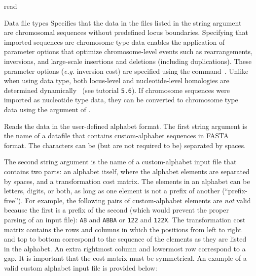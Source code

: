 \begin{command}{read}{}
\begin{arguments}
\begin{argumentgroup}{Data file types}
            {Specifies that the data in the files listed in the string argument
            are chromosomal sequences without predefined locus boundaries.
            Specifying that imported sequences are chromosome type data enables
            the application of parameter options that optimize chromosome-level
            events such as rearrangements, inversions, and large-scale
            insertions and deletions (including duplications). These parameter
            options (\emph{e.g.} inversion cost) are specified using the
            command~.  
            Unlike when using  data type,
            both locus-level and nucleotide-level homologies
            are determined dynamically~\cite{darlingetal2004, vinh2007} 
            (see tutorial \texttt{5.6}). If chromosome sequences were imported as
            nucleotide type data, they can be converted to chromosome type data
            using the argument  of
            .} 
            {}
            
            {Reads the data in the user-defined alphabet format. The first string argument is
            the name of a datafile that contains custom-alphabet sequences in FASTA format. 
            The characters can be (but are not required to be) separated by spaces.
            
            The second string argument is the name of a custom-alphabet input file that contains two parts:
            an alphabet itself, where the alphabet elements are separated by spaces, and a
            transformation cost matrix. The elements in an alphabet can be letters, digits, or
            both, as long as one element is not a prefix of another  (``prefix-free''). For
            example, the following pairs of custom-alphabet elements are \emph{not} valid
            because the first is a prefix of the second (which would prevent the proper parsing of
            an input file): \texttt{AB} and \texttt{ABBA} or \texttt{122} and \texttt{122X}.
            The transformation cost matrix contains the rows and columns in which the
            positions from left to right and top to bottom correspond to the sequence of the
            elements as they are listed in the alphabet. An extra rightmost column and lowermost
            row correspond to a gap. It is important that the cost matrix must be symmetrical. An example 
            of a valid custom alphabet input file is provided below:
       	  
}
\end{argumentgroup}
\end{arguments}
\end{command}
